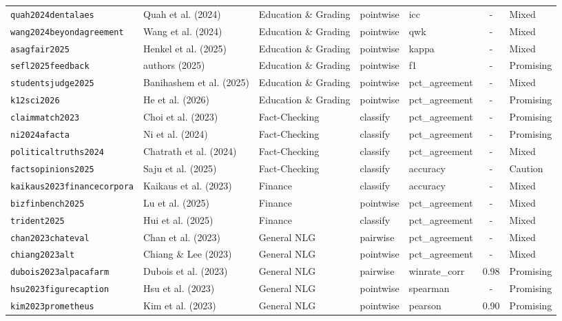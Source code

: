 \begin{longtable}{@{}l l l l l c l@{}}
\texttt{quah2024dentalaes} & Quah et al. (2024) & Education \& Grading & pointwise & icc & - & Mixed \\
\texttt{wang2024beyondagreement} & Wang et al. (2024) & Education \& Grading & pointwise & qwk & - & Mixed \\
\texttt{asagfair2025} & Henkel et al. (2025) & Education \& Grading & pointwise & kappa & - & Mixed \\
\texttt{sefl2025feedback} & authors (2025) & Education \& Grading & pointwise & f1 & - & Promising \\
\texttt{studentsjudge2025} & Banihashem et al. (2025) & Education \& Grading & pointwise & pct\_agreement & - & Mixed \\
\texttt{k12sci2026} & He et al. (2026) & Education \& Grading & pointwise & pct\_agreement & - & Promising \\
\texttt{claimmatch2023} & Choi et al. (2023) & Fact-Checking & classify & pct\_agreement & - & Promising \\
\texttt{ni2024afacta} & Ni et al. (2024) & Fact-Checking & classify & pct\_agreement & - & Promising \\
\texttt{politicaltruths2024} & Chatrath et al. (2024) & Fact-Checking & classify & pct\_agreement & - & Mixed \\
\texttt{factsopinions2025} & Saju et al. (2025) & Fact-Checking & classify & accuracy & - & Caution \\
\texttt{kaikaus2023financecorpora} & Kaikaus et al. (2023) & Finance & classify & accuracy & - & Mixed \\
\texttt{bizfinbench2025} & Lu et al. (2025) & Finance & pointwise & pct\_agreement & - & Mixed \\
\texttt{trident2025} & Hui et al. (2025) & Finance & classify & pct\_agreement & - & Mixed \\
\texttt{chan2023chateval} & Chan et al. (2023) & General NLG & pairwise & pct\_agreement & - & Mixed \\
\texttt{chiang2023alt} & Chiang \& Lee (2023) & General NLG & pointwise & pct\_agreement & - & Mixed \\
\texttt{dubois2023alpacafarm} & Dubois et al. (2023) & General NLG & pairwise & winrate\_corr & 0.98 & Promising \\
\texttt{hsu2023figurecaption} & Hsu et al. (2023) & General NLG & pointwise & spearman & - & Promising \\
\texttt{kim2023prometheus} & Kim et al. (2023) & General NLG & pointwise & pearson & 0.90 & Promising \\

\end{longtable}
